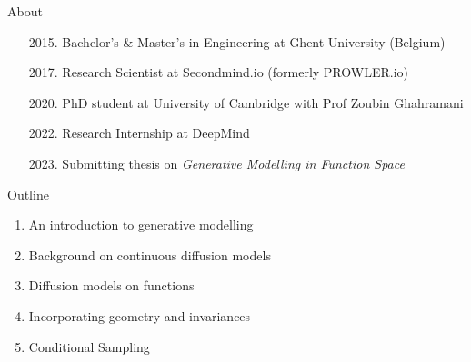 \begin{frame}{About}
\begin{center}
\begin{minipage}[c]{0.9\linewidth}
\begin{enumerate}
    \item[2015.] Bachelor's \& Master's in Engineering at Ghent University (Belgium)
    \item[2017.] Research Scientist at Secondmind.io (formerly PROWLER.io)
    \item[2020.] PhD student at University of Cambridge with Prof Zoubin Ghahramani
    \item[2022.] Research Internship at DeepMind
    \item[2023.] Submitting thesis on \emph{Generative Modelling in Function Space}
\end{enumerate}
\end{minipage}
\end{center}
\end{frame}

\begin{frame}{Outline}
\begin{enumerate}
    \item An introduction to generative modelling
    \item Background on continuous diffusion models
    \item Diffusion models on functions
    \item Incorporating geometry and invariances
    \item Conditional Sampling
\end{enumerate}
\end{frame}

